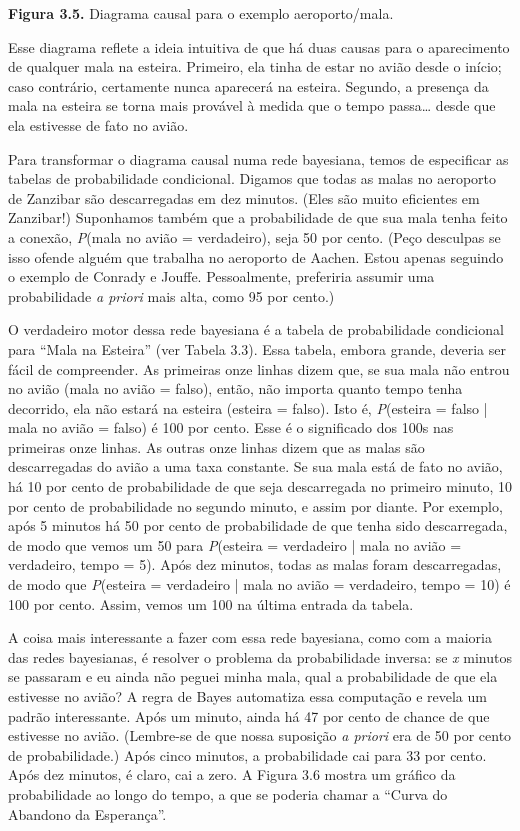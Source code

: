 \documentclass[11pt,a5paper,twoside]{book}
\begin{document}
\textbf{Figura 3.5.} Diagrama causal para o exemplo aeroporto/mala.

Esse diagrama reflete a ideia intuitiva de que há duas causas para o aparecimento de qualquer mala na esteira. Primeiro, ela tinha de estar no avião desde o início; caso contrário, certamente nunca aparecerá na esteira. Segundo, a presença da mala na esteira se torna mais provável à medida que o tempo passa… desde que ela estivesse de fato no avião.

Para transformar o diagrama causal numa rede bayesiana, temos de especificar as tabelas de probabilidade condicional. Digamos que todas as malas no aeroporto de Zanzibar são descarregadas em dez minutos. (Eles são muito eficientes em Zanzibar!) Suponhamos também que a probabilidade de que sua mala tenha feito a conexão, \textit{P}(mala no avião = verdadeiro), seja 50 por cento. (Peço desculpas se isso ofende alguém que trabalha no aeroporto de Aachen. Estou apenas seguindo o exemplo de Conrady e Jouffe. Pessoalmente, preferiria assumir uma probabilidade \textit{a priori} mais alta, como 95 por cento.)

O verdadeiro motor dessa rede bayesiana é a tabela de probabilidade condicional para “Mala na Esteira” (ver Tabela 3.3). Essa tabela, embora grande, deveria ser fácil de compreender. As primeiras onze linhas dizem que, se sua mala não entrou no avião (mala no avião = falso), então, não importa quanto tempo tenha decorrido, ela não estará na esteira (esteira = falso). Isto é, \textit{P}(esteira = falso | mala no avião = falso) é 100 por cento. Esse é o significado dos 100s nas primeiras onze linhas. As outras onze linhas dizem que as malas são descarregadas do avião a uma taxa constante. Se sua mala está de fato no avião, há 10 por cento de probabilidade de que seja descarregada no primeiro minuto, 10 por cento de probabilidade no segundo minuto, e assim por diante. Por exemplo, após 5 minutos há 50 por cento de probabilidade de que tenha sido descarregada, de modo que vemos um 50 para \textit{P}(esteira = verdadeiro | mala no avião = verdadeiro, tempo = 5). Após dez minutos, todas as malas foram descarregadas, de modo que \textit{P}(esteira = verdadeiro | mala no avião = verdadeiro, tempo = 10) é 100 por cento. Assim, vemos um 100 na última entrada da tabela.

A coisa mais interessante a fazer com essa rede bayesiana, como com a maioria das redes bayesianas, é resolver o problema da probabilidade inversa: se \textit{x} minutos se passaram e eu ainda não peguei minha mala, qual a probabilidade de que ela estivesse no avião? A regra de Bayes automatiza essa computação e revela um padrão interessante. Após um minuto, ainda há 47 por cento de chance de que estivesse no avião. (Lembre-se de que nossa suposição \textit{a priori} era de 50 por cento de probabilidade.) Após cinco minutos, a probabilidade cai para 33 por cento. Após dez minutos, é claro, cai a zero. A Figura 3.6 mostra um gráfico da probabilidade ao longo do tempo, a que se poderia chamar a “Curva do Abandono da Esperança”.
\end{document}
